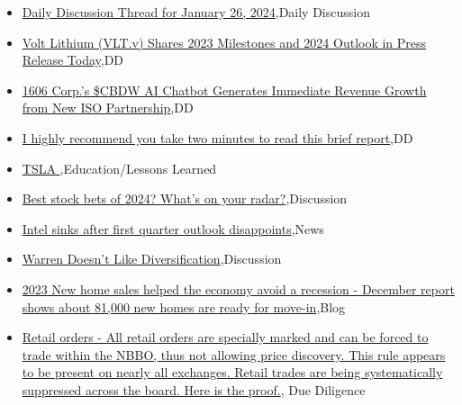 \documentclass{article}%
\begin{document}
%
\begin{itemize}%
\item%
\href{https://reddit.com/r/wallstreetbets/comments/1abfs7e/daily\_discussion\_thread\_for\_january\_26\_2024/}{Daily Discussion Thread for January 26, 2024},Daily Discussion%
\item%
\href{https://reddit.com/r/Baystreetbets/comments/19fny5o/volt\_lithium\_vltv\_shares\_2023\_milestones\_and\_2024/}{Volt Lithium (VLT.v) Shares 2023 Milestones and 2024 Outlook in Press Release Today},DD%
\item%
\href{https://reddit.com/r/Baystreetbets/comments/19fes9y/1606\_corps\_cbdw\_ai\_chatbot\_generates\_immediate/}{1606 Corp.'s \$CBDW AI Chatbot Generates Immediate Revenue Growth from New ISO Partnership},DD%
\item%
\href{https://reddit.com/r/Baystreetbets/comments/19fe1g2/i\_highly\_recommend\_you\_take\_two\_minutes\_to\_read/}{I highly recommend you take two minutes to read this brief report},DD%
\item%
\href{https://reddit.com/r/StockMarket/comments/1ab9rbf/tsla/}{TSLA   },Education/Lessons Learned%
\item%
\href{https://reddit.com/r/StockMarket/comments/1ab7ued/best\_stock\_bets\_of\_2024\_whats\_on\_your\_radar/}{Best stock bets of 2024? What's on your radar?},Discussion%
\item%
\href{https://reddit.com/r/StockMarket/comments/19fmbui/intel\_sinks\_after\_first\_quarter\_outlook/}{Intel sinks after first quarter outlook disappoints},News%
\item%
\href{https://reddit.com/r/StockMarket/comments/19fcg57/warren\_doesnt\_like\_diversification/}{Warren Doesn't Like Diversification},Discussion%
\item%
\href{https://reddit.com/r/Economics/comments/1ab6z3d/2023\_new\_home\_sales\_helped\_the\_economy\_avoid\_a/}{2023 New home sales helped the economy avoid a recession - December report shows about 81,000 new homes are ready for move-in},Blog%
\item%
\href{https://reddit.com/r/Superstonk/comments/1ab7ypn/retail\_orders\_all\_retail\_orders\_are\_specially/}{Retail orders - All retail orders are specially marked and can be forced to trade within the NBBO, thus not allowing price discovery. This rule appears to be present on nearly all exchanges. Retail trades are being systematically suppressed across the board. Here is the proof.}, Due Diligence%
\end{itemize}%
\end{document}
